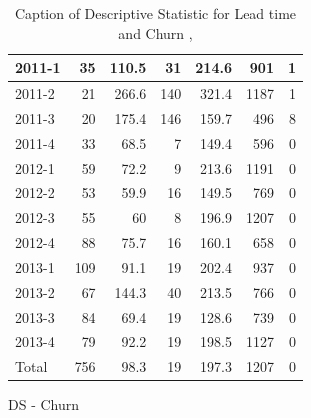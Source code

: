 \documentclass[UKenglish]{ifimaster}  %
\begin{document}
\begin{appendices}
\begin{table}[!htbp]
\begin{adjustwidth}{-1.5cm}{}
\begin{subfigure}[b]{0.3\textwidth}
{\begin{tabular}{ | l | r | r | r | r | r | r | }
 2011-1  & 35 & 110.5 & 31 & 214.6 & 901 & 1 \\ \hline
 2011-2  & 21 & 266.6 & 140 & 321.4 & 1187 & 1 \\ \hline
 2011-3  & 20 & 175.4 & 146 & 159.7 & 496 & 8 \\ \hline
 2011-4  & 33 & 68.5 & 7 & 149.4 & 596 & 0\\ \hline
 2012-1  & 59 & 72.2 & 9 & 213.6 & 1191 & 0\\ \hline
 2012-2  & 53 & 59.9 & 16 & 149.5 & 769 & 0\\ \hline
 2012-3  & 55 & 60 & 8 & 196.9 & 1207 & 0\\ \hline
 2012-4  & 88 & 75.7 & 16 & 160.1 & 658 & 0\\ \hline
 2013-1  & 109 & 91.1 & 19 & 202.4 & 937 & 0\\ \hline
 2013-2  & 67 & 144.3 & 40 & 213.5 & 766 & 0\\ \hline
 2013-3  & 84 & 69.4 & 19 & 128.6 & 739 & 0\\ \hline
 2013-4  & 79 & 92.2 & 19 & 198.5 & 1127 & 0\\ \hline
 Total  & 756 & 98.3 & 19 & 197.3 & 1207 & 0\\ \hline

\end{tabular}
}
\caption{DS - Churn}
 \label{DS:Churn:6}
\end{subfigure}
\end{adjustwidth}
\caption[Optional caption for list of figures]{Caption of Descriptive Statistic for Lead time and Churn  , }
\label{DS:6:3}
\end{table}


\end{appendices}
\end{document}
